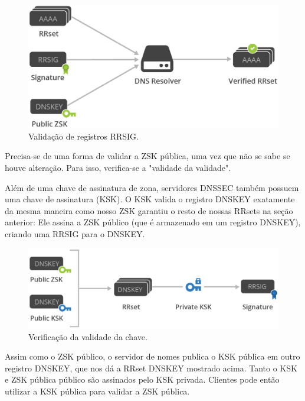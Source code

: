 \documentclass[12pt,openright,a4paper]{report}
\begin{document}
{\begin{figure}[h!]
	\centering
	\includegraphics[scale=0.4]{validation.eps}
	\caption{Validação de registros RRSIG.}
	\label{fig:keys}
\end{figure}

Precisa-se de uma forma de validar a ZSK pública, uma vez que não se sabe se houve alteração. Para isso, verifica-se a "validade da validade". 

Além de uma chave de assinatura de zona, servidores DNSSEC também possuem uma chave de assinatura (KSK). O KSK valida o registro DNSKEY exatamente da mesma maneira como nosso ZSK garantiu o resto de nossas RRsets na seção anterior: Ele assina a ZSK público (que é armazenado em um registro DNSKEY), criando uma RRSIG para o DNSKEY.

\begin{figure}[h!]
	\centering
	\includegraphics[scale=0.4]{valid_validation.eps}
	\caption{Verificação da validade da chave.}
	\label{fig:keys}
\end{figure}

Assim como o ZSK público, o servidor de nomes publica o KSK pública em outro registro DNSKEY, que nos dá a RRset DNSKEY mostrado acima. Tanto o KSK e ZSK pública público são assinados pelo KSK privada. Clientes pode então utilizar a KSK pública para validar a ZSK pública.

}
\end{document}
